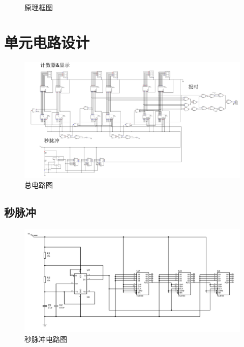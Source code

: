 \documentclass[lang=cn, 11pt, a4paper, cite=authornum, ctexfont]{paper}
\begin{document}
\begin{figure}[H]
	\begin{center}
		
		\caption{原理框图}
	\end{center}
\end{figure}

\section{单元电路设计}

\begin{figure}[H]
	\begin{center}
		\includegraphics[width=1\textwidth]{pdf/总电路.PDF}
		\caption{总电路图}
	\end{center}
\end{figure}

\subsection{秒脉冲}

\begin{figure}[H]
	\begin{center}
		\includegraphics[width=1\textwidth]{pdf/秒脉冲.PDF}
		\caption{秒脉冲电路图\label{ifg:miao}}
	\end{center}
\end{figure}
\end{document}
